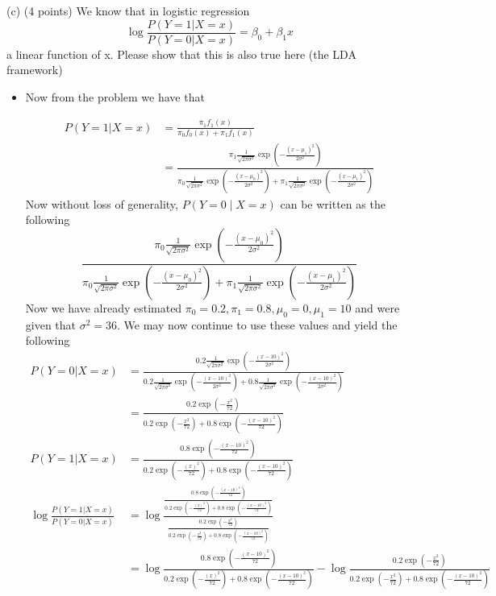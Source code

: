 \documentclass[
]{article}
\begin{document}
\begin{enumerate}
(c) (4 points) We know that in logistic regression 
$$
\log\frac{P(Y = 1 | X = x)}{P(Y= 0| X = x)} = \beta_0 + \beta_1x
$$
a linear function of x. Please show that this is also true here (the LDA framework)

\begin{itemize}

\item Now from the problem we have that 

\begin{align*}
P(Y = 1 | X = x) &= \frac{\pi_1 f_1(x)}{\pi_0f_0(x) + \pi_1f_1(x)} \\
&= \frac{\pi_1 \frac{1}{\sqrt{2\pi\sigma^2}}\exp\left(-\frac{(x-\mu_1)^2}{2\sigma^2}\right)}{\pi_0 \frac{1}{\sqrt{2\pi\sigma^2}}\exp\left(-\frac{(x-\mu_0)^2}{2\sigma^2}\right) + \pi_1 \frac{1}{\sqrt{2\pi\sigma^2}}\exp\left(-\frac{(x-\mu_1)^2}{2\sigma^2}\right)} 
\end{align*}
Now without loss of generality, $P(Y = 0 \mid X = x)$ can be written as the following 
$$
\frac{\pi_0 \frac{1}{\sqrt{2\pi\sigma^2}}\exp\left(-\frac{(x-\mu_0)^2}{2\sigma^2}\right)}{\pi_0 \frac{1}{\sqrt{2\pi\sigma^2}}\exp\left(-\frac{(x-\mu_0)^2}{2\sigma^2}\right) + \pi_1 \frac{1}{\sqrt{2\pi\sigma^2}}\exp\left(-\frac{(x-\mu_1)^2}{2\sigma^2}\right)}
$$
Now we have already estimated $\pi_0 = 0.2, \pi_1=0.8, \mu_0=0, \mu_1=10$ and were given that $\sigma^2=36$. We may now continue to use these values and yield the following 
\begin{align*}
P(Y = 0 | X = x) &= \frac{0.2 \frac{1}{\sqrt{2\pi\sigma^2}}\exp\left(-\frac{(x-10)^2}{2\sigma^2}\right)}{0.2 \frac{1}{\sqrt{2\pi\sigma^2}}\exp\left(-\frac{(x-10)^2}{2\sigma^2}\right) + 0.8 \frac{1}{\sqrt{2\pi\sigma^2}}\exp\left(-\frac{(x-10)^2}{2\sigma^2}\right)} \\
&= \frac{0.2\exp\left(-\frac{x^2}{72}\right)}{0.2\exp\left(-\frac{x^2}{72}\right) + 0.8\exp\left(-\frac{(x-10)^2}{72}\right)} \\
P(Y = 1 | X = x) &= \frac{0.8\exp\left(-\frac{(x-10)^2}{72}\right)}{0.2 \exp\left(-\frac{(x)^2}{72}\right) + 0.8 \exp\left(-\frac{(x-10)^2}{72}\right)}  \\
\log\frac{P(Y = 1 | X = x)}{P(Y = 0 | X = x)} &= \log\frac{\frac{0.8\exp\left(-\frac{(x-10)^2}{72}\right)}{0.2 \exp\left(-\frac{(x)^2}{72}\right) + 0.8 \exp\left(-\frac{(x-10)^2}{72}\right)}}{\frac{0.2\exp\left(-\frac{x^2}{72}\right)}{0.2\exp\left(-\frac{x^2}{72}\right) + 0.8\exp\left(-\frac{(x-10)^2}{72}\right)}} \\
&= \log\frac{0.8\exp\left(-\frac{(x-10)^2}{72}\right)}{0.2 \exp\left(-\frac{(x)^2}{72}\right) + 0.8 \exp\left(-\frac{(x-10)^2}{72}\right)} - \log\frac{0.2\exp\left(-\frac{x^2}{72}\right)}{0.2\exp\left(-\frac{x^2}{72}\right) + 0.8\exp\left(-\frac{(x-10)^2}{72}\right)} \\

\end{align*}
\end{itemize}
\end{enumerate}
\end{document}
